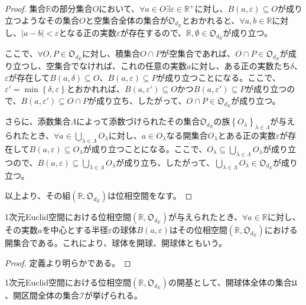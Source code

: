 \documentclass[dvipdfmx]{jsarticle}
\begin{document}
\begin{proof}
集合$\mathbb{R}$の部分集合$O$において、$\forall a \in O\exists\varepsilon \in \mathbb{R}^{+}$に対し、$B(a,\varepsilon) \subseteq O$が成り立つようなその集合$O$と空集合全体の集合が$\mathfrak{O}_{d_{E}}$とおかれると、$\forall a,b \in \mathbb{R}$に対し、$|a - b| < \varepsilon$となる正の実数$\varepsilon$が存在するので、$\mathbb{R},\emptyset \in \mathfrak{O}_{d_{E}}$が成り立つ。\par
ここで、$\forall O,P \in \mathfrak{O}_{d_{E}}$に対し、積集合$O \cap P$が空集合であれば、$O \cap P \in \mathfrak{O}_{d_{E}}$が成り立つし、空集合でなければ、これの任意の実数$a$に対し、ある正の実数たち$\delta$、$\varepsilon$が存在して$B(a,\delta) \subseteq O$、$B(a,\varepsilon) \subseteq P$が成り立つことになる。ここで、$\varepsilon' = \min\left\{ \delta,\varepsilon \right\}$とおかれれば、$B\left( a,\varepsilon' \right) \subseteq O$かつ$B\left( a,\varepsilon' \right) \subseteq P$が成り立つので、$B\left( a,\varepsilon' \right) \subseteq O \cap P$が成り立ち、したがって、$O \cap P \in \mathfrak{O}_{d_{E}}$が成り立つ。\par
さらに、添数集合$\varLambda$によって添数づけられたその集合$\mathfrak{O}_{d_{E}}$の族$\left\{ O_{\lambda} \right\}_{\lambda \in \varLambda }$が与えられたとき、$\forall a \in \bigcup_{\lambda \in \varLambda} O_{\lambda}$に対し、$a \in O_{\lambda}$なる開集合$O_{\lambda}$とある正の実数$\varepsilon$が存在して$B(a,\varepsilon) \subseteq O_{\lambda}$が成り立つことになる。ここで、$O_{\lambda} \subseteq \bigcup_{\lambda \in \varLambda} O_{\lambda}$が成り立つので、$B(a,\varepsilon) \subseteq \bigcup_{\lambda \in \varLambda} O_{\lambda}$が成り立ち、したがって、$\bigcup_{\lambda \in \varLambda} O_{\lambda} \in \mathfrak{O}_{d_{E}}$が成り立つ。\par
以上より、その組$\left( \mathbb{R},\mathfrak{O}_{d_{E}} \right)$は位相空間をなす。
\end{proof}
\begin{thm}\label{8.1.7.19}
1次元Euclid空間における位相空間$\left( \mathbb{R},\mathfrak{O}_{d_{E}} \right)$が与えられたとき、$\forall a \in \mathbb{R}$に対し、その実数$a$を中心とする半径$\varepsilon$の球体$B(a,\varepsilon)$はその位相空間$\left( \mathbb{R},\mathfrak{O}_{d_{E}} \right)$における開集合である。これにより、球体を開球、開球体ともいう。
\end{thm}
\begin{proof} 定義より明らかである。
\end{proof}
\begin{thm}\label{8.1.7.20}
1次元Euclid空間における位相空間$\left( \mathbb{R},\mathfrak{O}_{d_{E}} \right)$の開基として、開球体全体の集合$\mathfrak{U}$、開区間全体の集合$\mathcal{I}$が挙げられる。
\end{thm}
\end{document}
